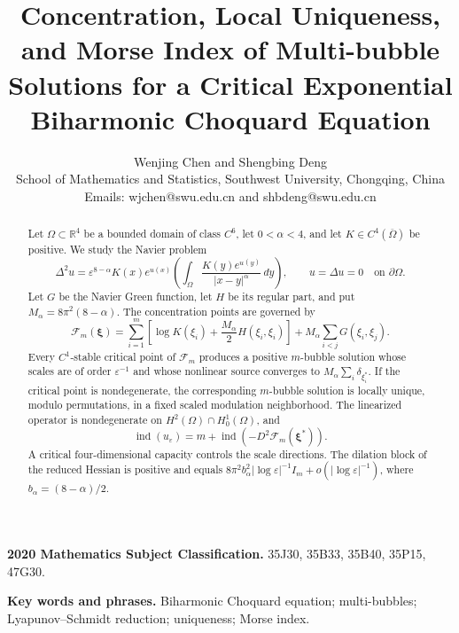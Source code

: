 \documentclass[11pt]{article}
\numberwithin{equation}{section}
\begin{document}
\title{Concentration, Local Uniqueness, and Morse Index of Multi-bubble Solutions for a Critical Exponential Biharmonic Choquard Equation}

\author{Wenjing Chen and Shengbing Deng\\
School of Mathematics and Statistics, Southwest University, Chongqing, China\\
Emails: wjchen@swu.edu.cn and shbdeng@swu.edu.cn}

\date{}

\maketitle

\begin{abstract}
Let $\Omega\subset\mathbb R^4$ be a bounded domain of class $C^6$,
let $0<\alpha<4$, and let $K\in C^4(\overline\Omega)$ be positive. We
study the Navier problem
\[
\Delta^2u=\varepsilon^{8-\alpha}K(x)e^{u(x)}
\left(\int_\Omega\frac{K(y)e^{u(y)}}{|x-y|^\alpha}\,dy\right),
\qquad
u=\Delta u=0\quad\text{on }\partial\Omega.
\]
Let $G$ be the Navier Green function, let $H$ be its regular part, and
put $M_\alpha=8\pi^2(8-\alpha)$. The concentration points are governed
by
\[
\mathcal F_m(\boldsymbol\xi)
=\sum_{i=1}^m
\left[\log K(\xi_i)+\frac{M_\alpha}{2}H(\xi_i,\xi_i)\right]
+M_\alpha\sum_{i<j}G(\xi_i,\xi_j).
\]
Every $C^1$-stable critical point of $\mathcal F_m$ produces a
positive $m$-bubble solution whose scales are of order
$\varepsilon^{-1}$ and whose nonlinear source converges to
$M_\alpha\sum_i\delta_{\xi_i^*}$. If the critical point is
nondegenerate, the corresponding $m$-bubble solution is locally
unique, modulo permutations, in a fixed scaled modulation
neighborhood. The linearized operator is
nondegenerate on $H^2(\Omega)\cap H_0^1(\Omega)$, and
\[
\operatorname{ind}(u_\varepsilon)
=m+\operatorname{ind}\!\left(-D^2\mathcal F_m(\boldsymbol\xi^*)\right).
\]
A critical four-dimensional capacity controls the scale directions.
The dilation block of the reduced Hessian is positive and equals
$8\pi^2b_\alpha^2|\log\varepsilon|^{-1}I_m+o(|\log\varepsilon|^{-1})$,
where $b_\alpha=(8-\alpha)/2$.
\end{abstract}

\noindent\textbf{2020 Mathematics Subject Classification.}
35J30, 35B33, 35B40, 35P15, 47G30.

\noindent\textbf{Key words and phrases.}
Biharmonic Choquard equation; multi-bubbles; Lyapunov--Schmidt reduction; uniqueness; Morse index.
\end{document}
